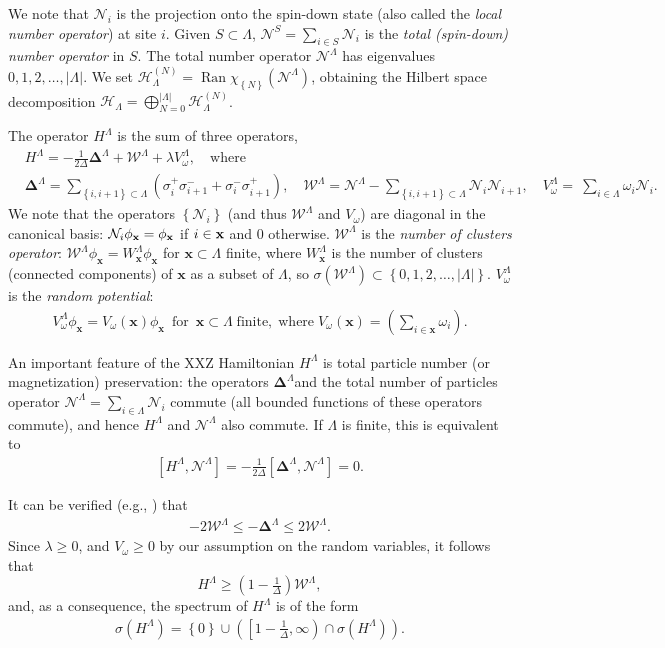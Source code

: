 \documentclass[12pt, a4paper,reqno]{amsart}
\numberwithin{equation}{section}
\DeclareMathOperator{\Ran}{Ran}
\newcommand\cW{\mathcal{W}}
\newcommand\x{\mathbf{x}}
\newcommand\cN{\mathcal{N}}
\newcommand\cH{\mathcal{H}}
\newcommand\beq{\begin{equation}}
\newcommand\eeq{\end{equation}}
\newcommand\be{\begin{equation}\begin{aligned}}
\newcommand\ee{\end{aligned}\end{equation}}
\newcommand{\abs}[1]{\left\lvert #1 \right\rvert}
\newcommand{\set}[1]{\left\{ #1 \right\}}
\newcommand{\pa}[1]{\left( #1 \right)}
\newcommand\La{\Lambda}
\newcommand{\up}[1]{^{\left(#1\right)}}
\newcommand{\qtx}[1]{\quad\text{#1}\quad}
\newcommand{\mqtx}[1]{\; \ \text{#1}\; \  }
\newcommand{\sqtx}[1]{\;\text{#1}\;}
\newcommand{\bD}{\boldsymbol{\Delta}}
\newcommand{\tfd}{\pa{1- \tfrac{1}{\Delta}}}
\begin{document}
We note that $\mathcal{N}_i$  is   the projection onto the spin-down state (also called the {\it local number operator}) at site $i$. Given $S\subset \Lambda$, 
 $\cN^{S} = \sum_{i\in S} \mathcal{N}_i$ is   the {\it total (spin-down) number  operator} in $S$.
  The total number operator $\cN^\La$  has eigenvalues $0,1,2,\ldots, \abs{\La}$.  We set  $\cH_\Lambda\up{N}=\Ran {\chi_{\set{N}}(\mathcal N^\Lambda)}$,  obtaining   the Hilbert space decomposition 
$ \cH_\La= \bigoplus_{N=0}^{\abs{\La}} \cH_\La\up{N}$.  

The operator $H^\La$ is the sum of three operators,
\be\label{bD}
&H^\La= -\tfrac 1 {2\Delta} \bD^\Lambda +\cW^\Lambda +\lambda   V^\La_\omega, \qtx{where}\\
& \bD^\Lambda = \sum_{\set{i,i+1}\subset \Lambda} \pa{\sigma_i^+\sigma_{i+1}^-+\sigma_i^-\sigma_{i+1}^+},\quad 
 \cW^\Lambda  = \cN^\Lambda -\sum_{\set{i,i+1}\subset \Lambda} \cN_i\cN_{i+1} ,
 \quad
 V^\La_\omega  = \ \sum_{i\in \Lambda} \omega_i \mathcal{N}_i.
 \ee
 We note that the operators $\set{\cN_i}$ (and thus $\cW^\Lambda$ and $ V_\omega$) are diagonal in the canonical basis:   $\cN_i \phi_{\bf x}=\phi_{\bf x}$ if $i\in {\bf x}$ and $0$ otherwise.  $\cW^\La$ is the \emph {number of clusters operator}:     $\cW^\La \phi_\x=W^\La_{\x}\phi_\x $ for $\x\subset \La$ finite, where $W^\La_{\x}$ is the number of clusters (connected components) of $\x$ as a subset of $\La$, so 
 $\sigma\pa {\cW^\La}\subset \set { 0,1,2,\ldots, \abs{ \La}}$.    $ V^\La_\omega $ is the \emph{random potential}:
 \be\label{bD2}
 V^\La_\omega \phi_\x= V_\omega(\x) \phi_\x \mqtx{for} \x\subset \La \;\text{finite}, \sqtx{where}   V_\omega(\x)=\pa{\sum_{i\in \x} \omega_i}.
 \ee

 
 
 An important feature of the XXZ Hamiltonian  $H^\Lambda$  is  total particle number (or magnetization) preservation:  the operators $ \bD^\Lambda$and the total  number of particles operator $\cN^\La= \sum_{i\in \La} \cN_i$ commute  (all bounded functions of these operators commute), and hence $H^\La$ and $\cN^\La$ also commute.  If $\La$ is finite,  this is equivalent to  
\be
[H^\La, \cN^\La]= -\tfrac{1}{2\Delta} [ \bD^\Lambda, \cN^\Lambda]  =0. 
\ee 
 
 It can be verified (e.g.,  \cite{EK22})  that   
\be\label{cWbD}
- 2\cW^\La  \le - \bD^\La \le 2\cW^\La  .
\ee
 Since $\lambda \ge 0$, and  $V_\omega\ge0$ by our assumption on  the random variables, it follows that
\beq\label{HtfdW}
H^\La \ge \tfd \cW^\La,
\eeq
and, as a consequence,  the spectrum of $H^\Lambda$ is  of the form  
\be\label{eq:spH}
\sigma(H^\Lambda)=\set{0} \cup \pa{\left[1 -\tfrac 1 \Delta, \infty \right ) \cap  \sigma(H^\Lambda) }.
\ee
\end{document}
